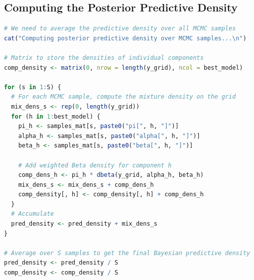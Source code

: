 \documentclass{article}
\begin{document}
\subsection{Computing the Posterior Predictive Density}
\begin{lstlisting}[language=R, firstnumber=15]
# We need to average the predictive density over all MCMC samples
cat("Computing posterior predictive density over MCMC samples...\n")

# Matrix to store the densities of individual components
comp_density <- matrix(0, nrow = length(y_grid), ncol = best_model)

for (s in 1:S) {
  # For each MCMC sample, compute the mixture density on the grid
  mix_dens_s <- rep(0, length(y_grid))
  for (h in 1:best_model) {
    pi_h <- samples_mat[s, paste0("pi[", h, "]")]
    alpha_h <- samples_mat[s, paste0("alpha[", h, "]")]
    beta_h <- samples_mat[s, paste0("beta[", h, "]")]
    
    # Add weighted Beta density for component h
    comp_dens_h <- pi_h * dbeta(y_grid, alpha_h, beta_h)
    mix_dens_s <- mix_dens_s + comp_dens_h
    comp_density[, h] <- comp_density[, h] + comp_dens_h
  }
  # Accumulate
  pred_density <- pred_density + mix_dens_s
}

# Average over S samples to get the final Bayesian predictive density
pred_density <- pred_density / S
comp_density <- comp_density / S
\end{lstlisting}
\end{document}
